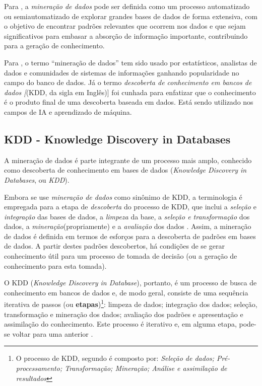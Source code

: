 Para , a \textit{mineração de dados} pode ser definida como um processo automatizado ou semiautomatizado de explorar grandes bases de dados de forma extensiva, com o objetivo de encontrar padrões relevantes que ocorrem nos dados e que sejam significativos para embasar a absorção de informação importante, contribuindo para a geração de conhecimento. 

Para , o termo ``mineração de dados'' tem sido usado  por estatísticos, analistas de dados e comunidades de sistemas de informações ganhando popularidade no campo do banco de dados. Já o termo \textit{descoberta de conhecimento em bancos de dados [}(KDD, da sigla em Inglês)] foi cunhada para enfatizar que o conhecimento é o produto final de uma descoberta baseada em dados. Está sendo utilizado nos campos de IA e aprendizado de máquina.


\subsection{KDD - Knowledge Discovery in Databases}
A mineração de dados é parte integrante de um processo mais amplo, conhecido como descoberta de conhecimento em bases de dados (\textit{Knowledge Discovery in Databases}, ou \textit{KDD})\cite{fayyad1996}. 

Embora se use \textit{mineração de dados} como sinônimo de KDD, a terminologia é empregada para a etapa de \textit{descoberta}  do processo de KDD, que inclui a \textit{seleção} e \textit{integração} das bases de dados, a \textit{limpeza} da base, a \textit{seleção e transformação} dos dados, a \textit{mineração}(propriamente) e a \textit{avaliação} dos dados \cite{ferrari2017, Boscarioli2017}. Assim, a mineração de dados  é definida em termos de esforços para a descoberta de padrões em bases de dados. A partir destes padrões descobertos, há condições de se gerar conhecimento útil para um processo de tomada de decisão (ou a geração de conhecimento para esta tomada).

O KDD (\textit{Knowledge Discovery in Database}), portanto, é um processo de busca de conhecimento em bancos de dados e, de modo geral, consiste de uma sequência iterativa de passos (ou \textbf{etapas})\footnote{O processo de KDD, segundo \cite{fayyad1996} é composto por: \textit{Seleção de dados; Pré-processamento; Transformação; Mineração; Análise e assimilação de resultados}}: limpeza de dados; integração dos dados; seleção, transformação e mineração dos dados; avaliação dos padrões e apresentação e assimilação do conhecimento. Este processo é iterativo e, em alguma etapa, pode-se voltar para uma anterior \cite{Boscarioli2017}.

